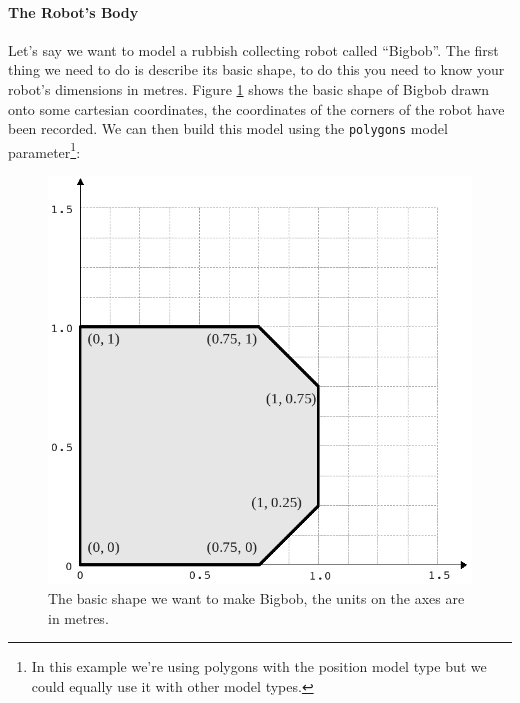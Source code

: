 \documentclass[a4paper]{article}
\begin{document}
\paragraph{The Robot's Body}
Let's say we want to model a rubbish collecting robot called ``Bigbob''. The first thing we need to do is describe its basic shape, to do this you need to know your robot's dimensions in metres. Figure \ref{fig:basicbigbob} shows the basic shape of Bigbob drawn onto some cartesian coordinates, the coordinates of the corners of the robot have been recorded. We can then build this model using the \verb|polygons| model parameter\footnote{In this example we're using polygons with the position model type but we could equally use it with other model types.}:
\begin{figure}
	\centering
	\includegraphics[width=0.7\linewidth]{./pics/robot_building/bigbob1.png} 
	\caption{The basic shape we want to make Bigbob, the units on the axes are in metres.}
	\label{fig:basicbigbob}
\end{figure}
\end{document}
